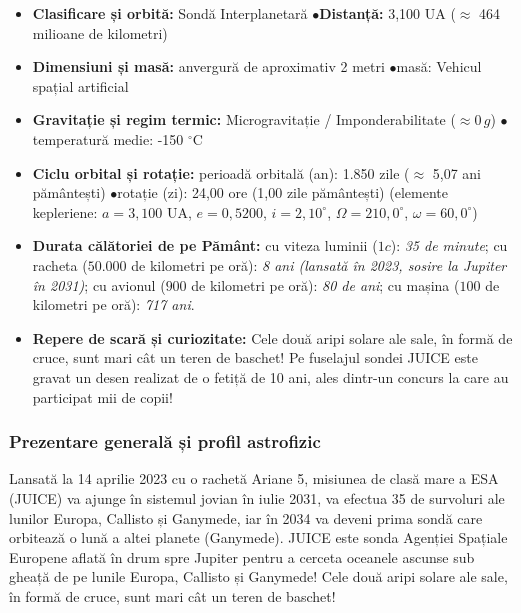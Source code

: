 \begin{tcolorbox}[orbitardata, title={\textbf{Repere esențiale: JUICE (Jupiter Icy Moons Explorer)}}]
\small
\begin{itemize}[leftmargin=1.4em, itemsep=2pt, topsep=2pt]
  \item \textbf{Clasificare și orbită:} Sondă Interplanetară \quad$\bullet$\quad \textbf{Distanță:} 3,100 UA ($\approx$ 464 milioane de kilometri)
  \item \textbf{Dimensiuni și masă:} anvergură de aproximativ 2 metri \quad$\bullet$\quad masă: Vehicul spațial artificial
  \item \textbf{Gravitație și regim termic:} Microgravitație / Imponderabilitate ($\approx 0\,g$) \quad$\bullet$\quad temperatură medie: -150 $^\circ$C
  \item \textbf{Ciclu orbital și rotație:} perioadă orbitală (an): 1.850 zile ($\approx$ 5,07 ani pământești) \quad$\bullet$\quad rotație (zi): 24,00 ore (1,00 zile pământești) (elemente kepleriene: $a = 3,100$ UA, $e = 0,5200$, $i = 2,10^\circ$, $\Omega = 210,0^\circ$, $\omega = 60,0^\circ$)
  \item \textbf{Durata călătoriei de pe Pământ:} cu viteza luminii ($1c$): \emph{35 de minute}; cu racheta ($50.000$ de kilometri pe oră): \emph{8 ani (lansată în 2023, sosire la Jupiter în 2031)}; cu avionul ($900$ de kilometri pe oră): \emph{80 de ani}; cu mașina ($100$ de kilometri pe oră): \emph{717 ani}.
  \item \textbf{Repere de scară și curiozitate:} Cele două aripi solare ale sale, în formă de cruce, sunt mari cât un teren de baschet! Pe fuselajul sondei JUICE este gravat un desen realizat de o fetiță de 10 ani, ales dintr-un concurs la care au participat mii de copii!
\end{itemize}
\end{tcolorbox}

\subsubsection*{Prezentare generală și profil astrofizic}
Lansată la 14 aprilie 2023 cu o rachetă Ariane 5, misiunea de clasă mare a ESA (JUICE) va ajunge în sistemul jovian în iulie 2031, va efectua 35 de survoluri ale lunilor Europa, Callisto și Ganymede, iar în 2034 va deveni prima sondă care orbitează o lună a altei planete (Ganymede). JUICE este sonda Agenției Spațiale Europene aflată în drum spre Jupiter pentru a cerceta oceanele ascunse sub gheață de pe lunile Europa, Callisto și Ganymede! Cele două aripi solare ale sale, în formă de cruce, sunt mari cât un teren de baschet!

